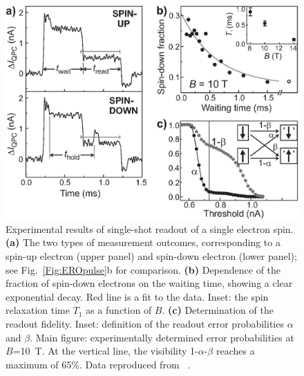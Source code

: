 \documentclass[rmp,twocolumn,aps]{revtex4}
\begin{document}
\begin{figure}[htb]
\includegraphics[width=12cm, clip=true]{hanson_fig16.eps}
\caption{Experimental results of single-shot readout of a single
electron spin. \textbf{(a)} The two types of measurement outcomes,
corresponding to a spin-up electron (upper panel) and spin-down
electron (lower panel); see Fig.~\ref{Fig:EROpulse}b for comparison. \textbf{(b)} Dependence of the fraction of
spin-down electrons on the waiting time, showing a clear
exponential decay. Red line is a fit to the data. Inset: the spin
relaxation time $T_1$ as a function of $B$. \textbf{(c)}
Determination of the readout fidelity. Inset: definition of the readout error probabilities $\alpha$ and $\beta$. Main figure: experimentally determined error probabilities at $B$=10~T. At the vertical line, the visibility 1-$\alpha$-$\beta$ reaches a maximum of
65\%. Data reproduced from ~\textcite{ElzermanNature2004}.} \label{Fig:EROresult}
\end{figure}
\end{document}
